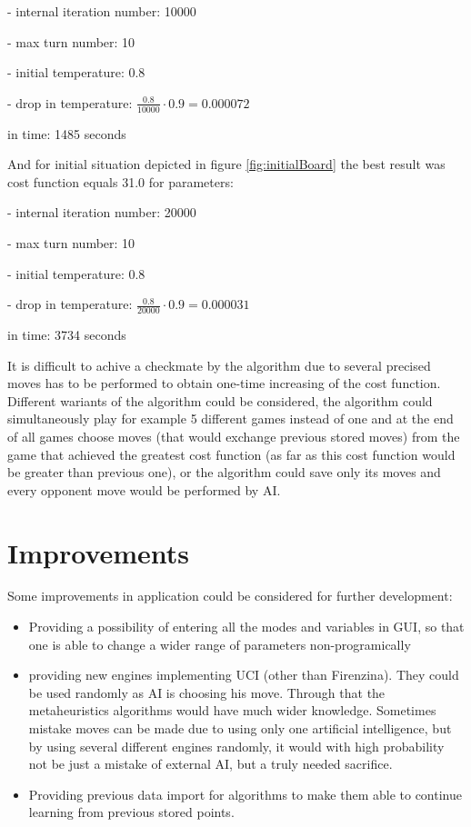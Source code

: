 \documentclass[pdftex]{article}
\begin{document}
- internal iteration number: 10000

- max turn number: 10

- initial temperature: 0.8

- drop in temperature: $\frac{0.8}{10000} \cdot 0.9 = 0.000072$

in time: 1485 seconds

And for initial situation depicted in figure \ref{fig:initialBoard} the best result was cost function equals 31.0 for parameters:

- internal iteration number: 20000

- max turn number: 10

- initial temperature: 0.8

- drop in temperature: $\frac{0.8}{20000} \cdot 0.9 = 0.000031$

in time: 3734 seconds

It is difficult to achive a checkmate by the algorithm due to several precised moves has to be performed to obtain one-time increasing of the cost function. Different wariants of the algorithm could be considered, the algorithm could simultaneously play for example 5 different games instead of one and at the end of all games choose moves (that would exchange previous stored moves) from the game that achieved the greatest cost function (as far as this cost function would be greater than previous one), or the algorithm could save only its moves and every opponent move would be performed by AI.

\section{Improvements}
\label{sec:improvements}

Some improvements in application could be considered for further development:
\begin{itemize}
 	\item Providing a possibility of entering all the modes and variables in GUI, so that one is able to change a wider range of parameters non-programically 
 	\item providing new engines implementing UCI (other than Firenzina). They could be used randomly as AI is choosing his move. Through that the metaheuristics algorithms would have much wider knowledge. Sometimes mistake moves can be made due to using only one artificial intelligence, but by using several different engines randomly, it would with high probability not be just a mistake of external AI, but a truly needed sacrifice.
 	\item Providing previous data import for algorithms to make them able to continue learning from previous stored points.
\end{itemize}
\end{document}
